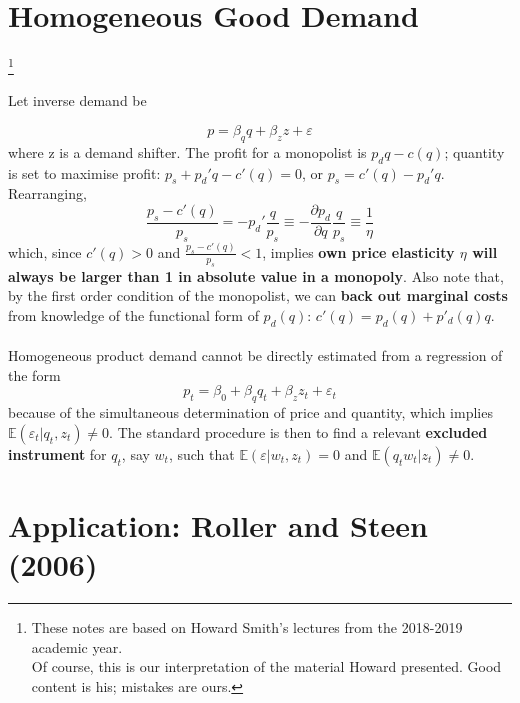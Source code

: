 \documentclass[11pt]{article}
\numberwithin{equation}{section}
\newcommand\blfootnote[1]{%
	\begingroup
	\renewcommand\thefootnote{}\footnote{#1}%
	\addtocounter{footnote}{-1}%
	\endgroup
}
\begin{document}
\onehalfspacing

\section{Homogeneous Good Demand}

\blfootnote{These notes are based on Howard Smith's lectures from the 2018-2019 academic year.\\
Of course, this is our interpretation of the material Howard presented. Good content is his; mistakes are ours.}

\vspace{-1cm}
Let inverse demand be

\begin{equation}
	p = \beta_q q + \beta_z z + \varepsilon
\end{equation}
where z is a demand shifter. The profit for a monopolist is $p_d q - c(q)$; quantity is set to maximise profit: $p_s + p_d'q - c'(q) = 0$, or $p_s = c'(q) - p_d'q$. Rearranging,
\begin{equation}
\label{ownelas}
	\frac{p_s - c'(q)}{p_s} = -p_d' \frac{q}{p_s} \equiv - \frac{\partial p_d}{\partial q} \frac{q}{p_s} \equiv \frac{1}{\eta}
\end{equation}
which, since $c'(q) > 0$ and $\frac{p_s - c'(q)}{p_s} < 1$, implies \textbf{own price elasticity $\eta$ will always be larger than 1 in absolute value in a monopoly}. Also note that, by the first order condition of the monopolist, we can \textbf{back out marginal costs} from knowledge of the functional form of $p_d(q)$: $c'(q) = p_d(q) + p'_d(q)q$. \\\\

Homogeneous product demand cannot be directly estimated from a regression of the form
\begin{equation}
	p_t = \beta_0 + \beta_q q_t + \beta_z z_t + \varepsilon_t
\end{equation}
because of the simultaneous determination of price and quantity, which implies $\mathbb{E}(\varepsilon_t| q_t,z_t) \neq 0$. The standard procedure is then to find a relevant \textbf{excluded instrument} for $q_t$, say $w_t$, such that $\mathbb{E}(\varepsilon|w_t,z_t) = 0$ and $\mathbb{E}(q_tw_t|z_t)\neq0$.

\section{Application: Roller and Steen (2006)}
\end{document}
